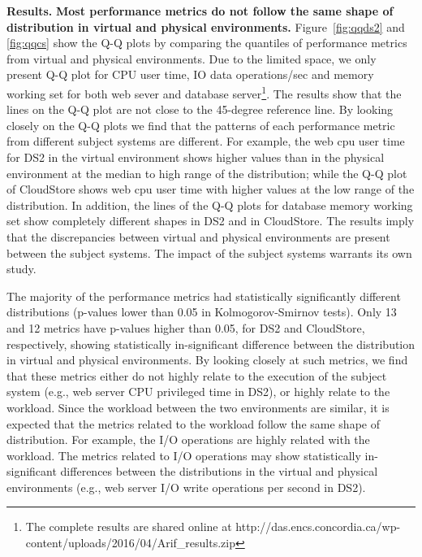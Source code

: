 \noindent \textbf{Results.}
\textbf{Most performance metrics do not follow the same shape of distribution in virtual and physical environments.} Figure~\ref{fig:qqds2} and \ref{fig:qqcs} show the Q-Q plots by comparing the quantiles of performance metrics from virtual and physical environments. Due to the limited space, we only present Q-Q plot for CPU user time, IO data operations/sec and memory working set for both web sever and database server\footnote{The complete results are shared online at http://das.encs.concordia.ca/wp-content/uploads/2016/04/Arif\_results.zip}. The results show that the lines on the Q-Q plot are not close to the 45-degree reference line. By looking closely on the Q-Q plots we find that the patterns of each performance metric from different subject systems are different. For example, the web cpu  user time for DS2 in the virtual environment shows higher values than in the physical environment at the median to high range of the distribution; while the Q-Q plot of CloudStore shows web cpu user time with higher values at the low range of the distribution. In addition, the lines of the Q-Q plots for database memory working set show completely different shapes in DS2 and in CloudStore. The results imply that the discrepancies between virtual and physical environments are present between the subject systems. The impact of the subject systems warrants its own study.

The majority of the performance metrics had statistically significantly different distributions (p-values lower than 0.05 in Kolmogorov-Smirnov tests). Only 13 and 12 metrics  have p-values higher than 0.05, for DS2 and CloudStore, respectively, showing statistically in-significant difference between the distribution in virtual and physical environments. By looking closely at such metrics, we find that these metrics either do not highly relate to the execution of the subject system (e.g., web server CPU privileged time in DS2), or highly relate to the workload. Since the workload between the two environments are similar, it is expected that the metrics related to the workload follow the same shape of distribution. For example, the I/O operations are highly related with the workload. The metrics related to I/O operations may show statistically in-significant differences between the distributions in the virtual and physical environments (e.g., web server I/O write operations per second in DS2). %


